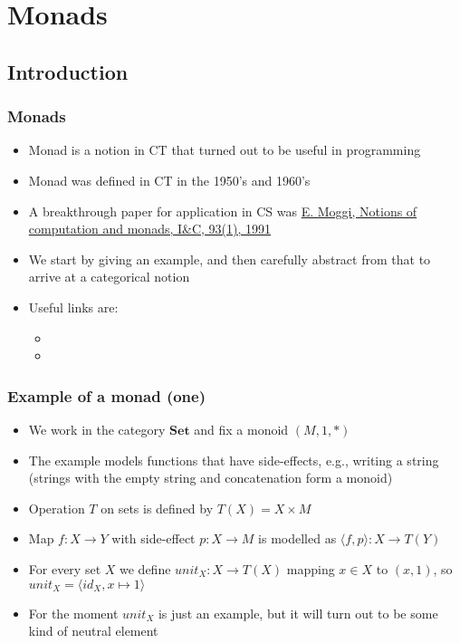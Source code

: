 \documentclass[handout]{beamer}
\title[INF223 presentations]{}
\newcommand{\bfsf}[1]{{\boldsymbol{#1}}}
\newcommand{\Set}{\bfsf{Set}}
\newcommand{\Kp}[1]{{\langle #1 \rangle}}
\begin{document}
\section{Monads}
\subsection{Introduction}
 
\frame
  {   
    \frametitle{Monads}\label{Mon5:Intro}

 \begin{itemize}[<+->]
\item Monad is a notion in CT that turned out to be useful in programming
\item Monad was defined in CT in the 1950's and 1960's
\item A breakthrough paper for application in CS was 
\href{https://person.dibris.unige.it/moggi-eugenio/ftp/ic91.pdf}{\color{blue}E. Moggi, Notions of computation and monads, I\&C, 93(1), 1991}
\item We start by giving an example, and then carefully abstract from that
to arrive at a categorical notion
\item Useful links are:
 \begin{itemize}
    \item {}
    \item {}
 \end{itemize}
 \end{itemize}

 }

\frame
  {   
    \frametitle{Example of a monad (one)}\label{Mon5:ExaSetMone}

 \begin{itemize}[<+->]
\item We work in the category $\Set$ and fix a monoid $(M,1,*)$
\item The example models functions that have side-effects, e.g., writing a
string (strings with the empty string and concatenation form a monoid)
\item Operation $T$ on sets is defined by $T(X)= X\times M$
\item Map $f : X\to Y$ with side-effect $p : X\to M$ is modelled as $\Kp{f,p} : X\to T(Y)$
\item For every set $X$ we define $unit_X: X\to T(X)$ mapping $x\in X$ to $(x,1)$,
so $unit_X = \Kp{id_X,x\mapsto 1}$
\item For the moment $unit_X$ is just an example, but it will turn out to
be some kind of neutral element
 \end{itemize}
 }
\end{document}
